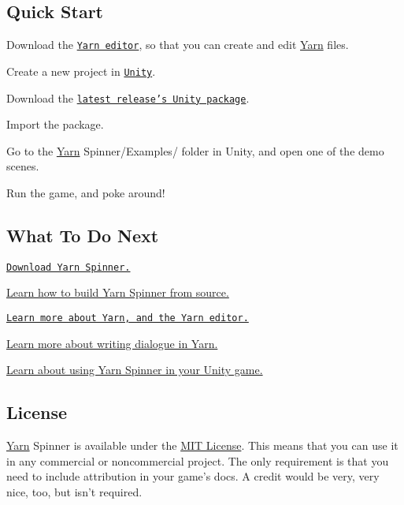 \subsection*{Quick Start}


\begin{DoxyEnumerate}
\item Download the \href{https://github.com/InfiniteAmmoInc/Yarn}{\tt Yarn editor}, so that you can create and edit \hyperlink{a00026}{Yarn} files.
\end{DoxyEnumerate}
\begin{DoxyEnumerate}
\item Create a new project in \href{https://unity3d.com/get-unity}{\tt Unity}.
\item Download the \href{https://github.com/thesecretlab/YarnSpinner/releases}{\tt latest release's Unity package}.
\item Import the package.
\item Go to the {\ttfamily \hyperlink{a00026}{Yarn} Spinner/\-Examples/} folder in Unity, and open one of the demo scenes.
\item Run the game, and poke around!
\end{DoxyEnumerate}

\subsection*{What To Do Next}


\begin{DoxyItemize}
\item \href{https://github.com/thesecretlab/YarnSpinner/releases}{\tt Download Yarn Spinner.}
\item \hyperlink{a00006}{Learn how to build Yarn Spinner from source.}
\item \href{https://github.com/infiniteammoinc/Yarn}{\tt Learn more about Yarn, and the Yarn editor.}
\item \hyperlink{a00014}{Learn more about writing dialogue in Yarn.}
\item \hyperlink{a00012}{Learn about using Yarn Spinner in your Unity game.}
\end{DoxyItemize}

\subsection*{License}

\hyperlink{a00026}{Yarn} Spinner is available under the \hyperlink{a00016}{M\-I\-T License}. This means that you can use it in any commercial or noncommercial project. The only requirement is that you need to include attribution in your game's docs. A credit would be very, very nice, too, but isn't required.


